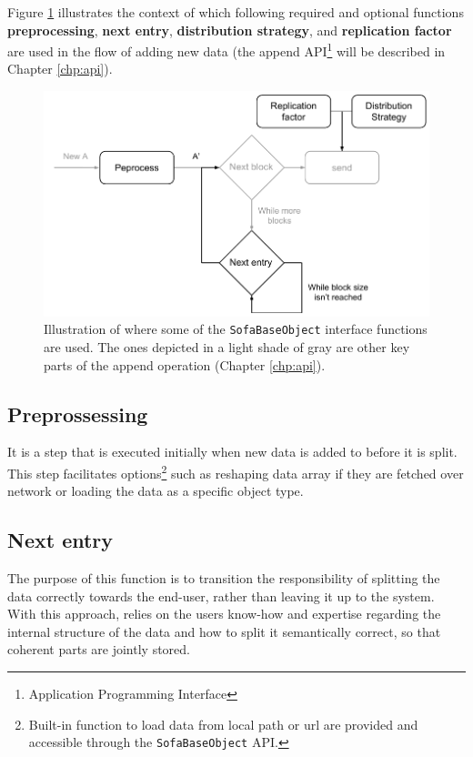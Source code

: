 Figure \ref{fig:preprocess-nextentry} illustrates the context of which following required and optional functions \textbf{preprocessing}, \textbf{next entry}, \textbf{distribution strategy}, and \textbf{replication factor} are used in the flow of adding new data (the append API\footnote{Application Programming Interface} will be described in Chapter \ref{chp:api}).

\begin{figure}
	\centering
	\includegraphics[scale=0.8]{pdf/preprocess-nextentry.pdf}
	\caption[\texttt{SofaBaseObject} interface functions]{Illustration of where some of the \texttt{SofaBaseObject} interface functions are used. The ones depicted in a light shade of gray are other key parts of the append operation (Chapter \ref{chp:api}). \label{fig:preprocess-nextentry}}
\end{figure}	

\subsection{Preprossessing}
It is a step that is executed initially when new data is added to \CodeName before it is split. This step facilitates options\footnote{Built-in \CodeName function to load data from local path or url are provided and accessible through the \texttt{SofaBaseObject} API.} such as reshaping data array if they are fetched over network or loading the data as a specific object type.

\subsection{Next entry}
The purpose of this function is to transition the responsibility of splitting the data correctly towards the end-user, rather than leaving it up to the system. With this approach, \CodeName relies on the users know-how and expertise regarding the internal structure of the data and how to split it semantically correct, so that coherent parts are jointly stored.
\newline

